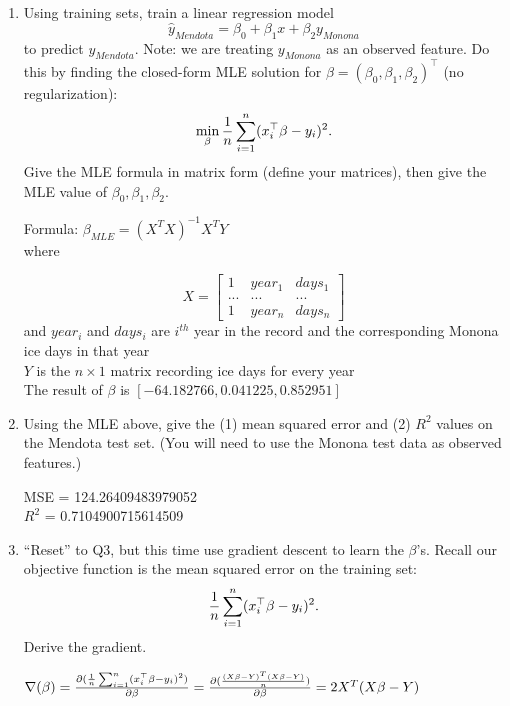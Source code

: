 \documentclass[a4paper]{article}
\theoremstyle{definition}
\newenvironment{soln}{
    \leavevmode\color{blue}\ignorespaces
}{}
\begin{document}
\begin{enumerate}
\item
Using training sets, train a linear regression model
$$\hat y_{Mendota} = \beta_0 + \beta_1 x + \beta_2 y_{Monona}$$
to predict $y_{Mendota}$.
Note: we are treating $y_{Monona}$ as an observed feature.
Do this by finding the closed-form MLE solution for $\beta=(\beta_0, \beta_1, \beta_2)^\top$ (no regularization):
$$\min_\beta {1\over n} \sum_{i=1}^n (x_i^\top \beta - y_i)^2.$$
Give the MLE formula in matrix form (define your matrices), then give the MLE value of $\beta_0, \beta_1, \beta_2$. 

\begin{soln}
Formula: $\beta_{MLE} =  (X^TX)^{-1}X^TY$\\
where 

$$  
X =
\begin{bmatrix}
   1 & year_1 & days_1 \\
   ...& ... & ... \\
   1 & year_{n} & days_{n} 
 \end{bmatrix} $$ 
and $year_i$ and $days_i$ are $i^{th}$ year in the record and the corresponding Monona ice days in that year\\
$Y$ is the $n\times 1$ matrix recording ice days for every year\\
The result of $\beta$ is $[-64.182766, 0.041225, 0.852951]$

\end{soln} 


\item
Using the MLE above, give the (1) mean squared error and (2) $R^2$ values on the Mendota test set.
(You will need to use the Monona test data as observed features.)


\begin{soln}
MSE = 124.26409483979052\\ 
$R^{2}$ = 0.7104900715614509
\end{soln}

\item
``Reset'' to Q3, but this time use gradient descent to learn the $\beta$'s.
Recall our objective function is the mean squared error on the training set:
$${1\over n} \sum_{i=1}^n (x_i^\top \beta - y_i)^2.$$
Derive the gradient.

\begin{soln}
$\nabla(\beta) \\= \frac{\partial ({1\over n} \sum_{i=1}^n (x_i^\top \beta - y_i)^2)}{\partial \beta} \\= \frac{\partial (\frac{(X\beta - Y)^T(X\beta - Y)}{n})}{\partial \beta}\\= 2X^T(X\beta - Y)$
\end{soln}


\end{enumerate}
\end{document}
